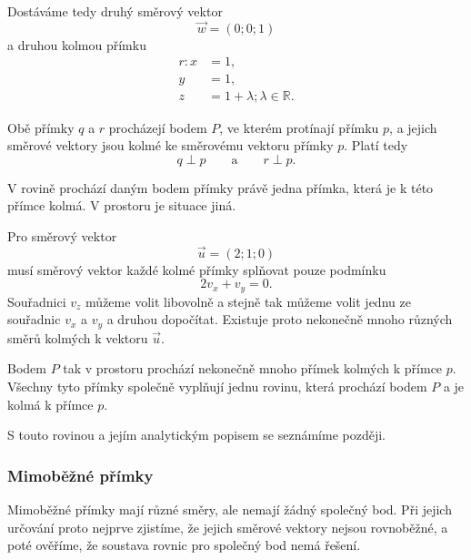 \begin{example}
    Dostáváme tedy druhý směrový vektor
    \[
        \vec{w}=(0;0;1)
    \]
    a druhou kolmou přímku
    \[
        \begin{aligned}
            r: x&=1,\\
            y&=1,\\
            z&=1+\lambda; \lambda\in\mathbb{R}.
        \end{aligned}
    \]

    Obě přímky $q$ a $r$ procházejí bodem $P$, ve kterém protínají
    přímku $p$, a jejich směrové vektory jsou kolmé ke směrovému
    vektoru přímky $p$. Platí tedy
    \[
        q\perp p
        \qquad\text{a}\qquad
        r\perp p.
    \]
\end{example}

\begin{remark}
    V rovině prochází daným bodem přímky právě jedna přímka, která je
    k této přímce kolmá. V prostoru je situace jiná.

    Pro směrový vektor
    \[
        \vec{u}=(2;1;0)
    \]
    musí směrový vektor každé kolmé přímky splňovat pouze podmínku
    \[
        2v_x+v_y=0.
    \]
    Souřadnici $v_z$ můžeme volit libovolně a stejně tak můžeme volit
    jednu ze souřadnic $v_x$ a $v_y$ a druhou dopočítat. Existuje proto
    nekonečně mnoho různých směrů kolmých k vektoru $\vec{u}$.

    Bodem $P$ tak v prostoru prochází nekonečně mnoho přímek kolmých
    k přímce $p$. Všechny tyto přímky společně vyplňují jednu rovinu,
    která prochází bodem $P$ a je kolmá k přímce $p$.

    S touto rovinou a jejím analytickým popisem se seznámíme později.
\end{remark}

\subsubsection{Mimoběžné přímky}
\label{subsubsec:Skew_parametric_lines_space}

Mimoběžné přímky mají různé směry, ale nemají žádný společný bod.
Při jejich určování proto nejprve zjistíme, že jejich směrové vektory
nejsou rovnoběžné, a poté ověříme, že soustava rovnic pro společný bod
nemá řešení.

